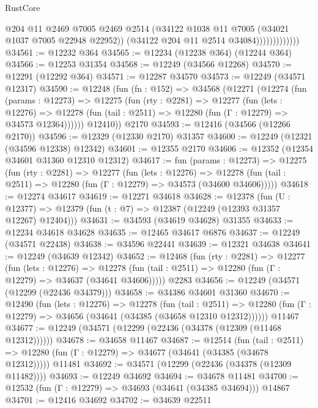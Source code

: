 \begin{lexlean}{RustCore}
\begin{coremodule}
                            @204
                            @11
                            @2469
                            @7005
                            @2469
                            @2514
                            (@34122 @1038 @11 @7005 (@34021 @1037 @7005 @22948 @22952))
                            (@34122 @204 @11 @2514 @34084)))))))))))))
@34561 := @12232 @364
@34565 := @12234 (@12238 @364) (@12244 @364)
@34566 := @12253 @31354
@34568 := @12249 (@34566 @12268)
@34570 := @12291 (@12292 @364)
@34571 := @12287 @34570
@34573 := @12249 (@34571 @12317)
@34590 := @12248
    (fun (fn : @152) =>
    @34568
      (@12271
        (@12274
          (fun (params : @12273) =>
          @12275
            (fun (rty : @2281) =>
            @12277
              (fun (lets : @12276) =>
              @12278 (fun (tail : @2511) => @12280 (fun (Γ : @12279) => @34573 @12364))))))
        @12410))
    @2170
@34593 := @12416 (@34566 (@12266 @2170))
@34596 := @12329 (@12330 @2170) @31357
@34600 := @12249 (@12321 (@34596 @12338) @12342)
@34601 := @12355 @2170
@34606 := @12352 (@12354 @34601 @31360 @12310 @12312)
@34617 := fun (params : @12273) =>
  @12275
    (fun (rty : @2281) =>
    @12277
      (fun (lets : @12276) =>
      @12278 (fun (tail : @2511) => @12280 (fun (Γ : @12279) => @34573 (@34600 @34606)))))
@34618 := @12274 @34617
@34619 := @12271 @34618
@34628 := @12378
    (fun (U : @12377) => @12379 (fun (t : @7) => @12387 (@12249 (@12393 @31357 @12267) @12404)))
@34631 := @34593 (@34619 @34628) @31355
@34633 := @12234 @34618 @34628
@34635 := @12465 @34617 @6876
@34637 := @12249 (@34571 @22438)
@34638 := @34596 @22441
@34639 := @12321 @34638
@34641 := @12249 (@34639 @12342)
@34652 := @12468
    (fun (rty : @2281) =>
    @12277
      (fun (lets : @12276) =>
      @12278 (fun (tail : @2511) => @12280 (fun (Γ : @12279) => @34637 (@34641 @34606)))))
    @2283
@34656 := @12249 (@34571 (@12299 (@22436 @34379)))
@34658 := @34386 @34601 @31360
@34670 := @12490
    (fun (lets : @12276) =>
    @12278
      (fun (tail : @2511) =>
      @12280 (fun (Γ : @12279) => @34656 (@34641 (@34385 (@34658 @12310 @12312))))))
    @11467
@34677 := @12249 (@34571 (@12299 (@22436 (@34378 (@12309 (@11468 @12312))))))
@34678 := @34658 @11467
@34687 := @12514
    (fun (tail : @2511) => @12280 (fun (Γ : @12279) => @34677 (@34641 (@34385 (@34678 @12312)))))
    @11481
@34692 := @34571 (@12299 (@22436 (@34378 (@12309 @11482))))
@34693 := @12249 @34692
@34694 := @34678 @11481
@34700 := @12532 (fun (Γ : @12279) => @34693 (@34641 (@34385 @34694))) @14867
@34701 := @12416 @34692
@34702 := @34639 @22511

\end{coremodule}
\end{lexlean}
